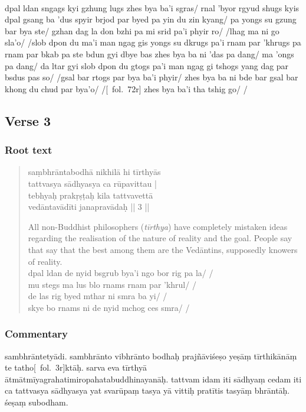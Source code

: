 \documentclass[12pt]{article}
\begin{document}
\textbf{\TVB}\\
dpal ldan sngags kyi gzhung lugs zhes bya ba'i sgras/ rnal 'byor rgyud shugs kyis dpal gsang ba 'dus spyir brjod par byed pa yin du zin kyang/ pa yongs su gzung bar bya ste/ gzhan dag la don bzhi pa mi srid pa'i phyir ro/ /lhag ma ni go sla'o/ /slob dpon du ma'i man ngag gis yongs su dkrugs pa'i rnam par 'khrugs pa rnam par bkab pa ste bdun gyi dbye bas zhes bya ba ni 'das pa dang/ ma 'ongs pa dang/ da ltar gyi slob dpon du gtogs pa'i man ngag gi tshogs yang dag par bsdus pas so/ /gsal bar rtogs par bya ba'i phyir/ zhes bya ba ni bde bar gsal bar khong du chud par bya'o/ /[\TVB\ fol.\ 72r] zhes bya ba'i tha tshig go/ /

\subsection{Verse 3}
\subsubsection{Root text}
\begin{quote}
	saṃbhrāntabodhā nikhilā hi tīrthyās \\%
	tattvasya sādhyasya ca rūpavittau |\\
	tebhyaḥ prakṛṣṭaḥ kila tattvavettā\\
	vedāntavādīti janapravādaḥ || 3 ||

	All non-Buddhist philosophers (\emph{tīrthya}) have completely mistaken ideas regarding the realisation of the nature of reality and the goal.
	People say that say that the best among them are the Vedāntins, supposedly knowers of reality.\\

	dpal ldan de nyid bsgrub bya'i ngo bor rig pa la/ /\\
	mu stegs ma lus blo rnams rnam par 'khrul/ /\\
	de las rig byed mthar ni smra ba yi/ /\\
	skye bo rnams ni de nyid mchog ces smra/ /
\end{quote}

\subsubsection{Commentary}
sambhrāntetyādi.
sambhrānto vibhrānto bodhaḥ prajñāviśeṣo yeṣāṃ tīrthikānāṃ te tatho[\MS\ fol.\ 3r]ktāḥ.\footnoteB{
	te tathoktāḥ]; \MS\PCreading ; te thoktāḥ \MS\ACreading ; tathoktāḥ \EDD
}
sarva eva tīrthyā ātmātmīyagrahatimiropahatabuddhinayanāḥ.
tattvam idam iti sādhyaṃ cedam iti ca tattvasya sādhyasya yat\footnoteB{
	yat] \EDD\ (\emd); tat \MS
} svarūpaṃ tasya yā vittiḥ pratītis tasyāṃ bhrāntāḥ.
śeṣaṃ subodham.\\
\end{document}
